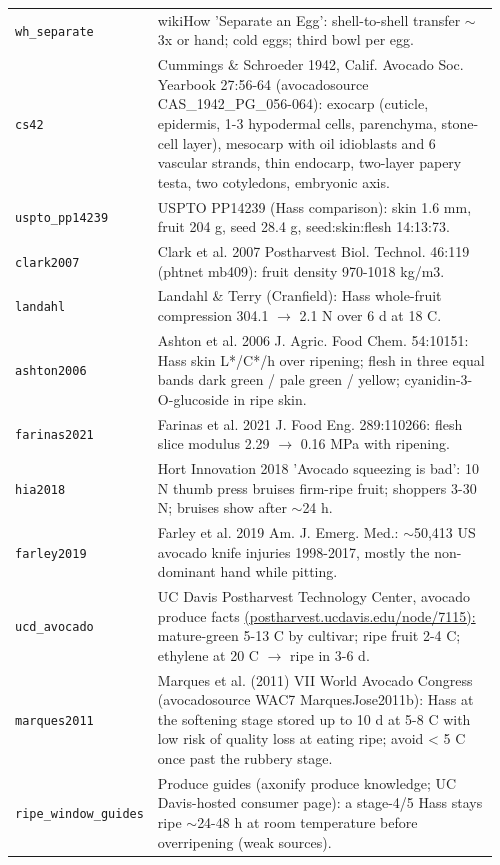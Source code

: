 \documentclass[10.5pt,a4paper]{article}
\begin{document}
{\begin{longtable}{@{}p{0.16\linewidth}p{0.8\linewidth}@{}}
\texttt{wh\_\allowbreak{}separate} & wikiHow 'Separate an Egg': shell-to-shell transfer $\sim$3x or hand; cold eggs; third bowl per egg. \\
\texttt{cs42} & Cummings \& Schroeder 1942, Calif. Avocado Soc. Yearbook 27:56-64 (avocadosource CAS\_1942\_PG\_056-064): exocarp (cuticle, epidermis, 1-3 hypodermal cells, parenchyma, stone-cell layer), mesocarp with oil idioblasts and 6 vascular strands, thin endocarp, two-layer papery testa, two cotyledons, embryonic axis. \\
\texttt{uspto\_\allowbreak{}pp14239} & USPTO PP14239 (Hass comparison): skin 1.6 mm, fruit 204 g, seed 28.4 g, seed:skin:flesh 14:13:73. \\
\texttt{clark2007} & Clark et al. 2007 Postharvest Biol. Technol. 46:119 (phtnet mb409): fruit density 970-1018 kg/m3. \\
\texttt{landahl} & Landahl \& Terry (Cranfield): Hass whole-fruit compression 304.1 $\to$ 2.1 N over 6 d at 18 C. \\
\texttt{ashton2006} & Ashton et al. 2006 J. Agric. Food Chem. 54:10151: Hass skin L*/C*/h over ripening; flesh in three equal bands dark green / pale green / yellow; cyanidin-3-O-glucoside in ripe skin. \\
\texttt{farinas2021} & Farinas et al. 2021 J. Food Eng. 289:110266: flesh slice modulus 2.29 $\to$ 0.16 MPa with ripening. \\
\texttt{hia2018} & Hort Innovation 2018 'Avocado squeezing is bad': 10 N thumb press bruises firm-ripe fruit; shoppers 3-30 N; bruises show after $\sim$24 h. \\
\texttt{farley2019} & Farley et al. 2019 Am. J. Emerg. Med.: $\sim$50,413 US avocado knife injuries 1998-2017, mostly the non-dominant hand while pitting. \\
\texttt{ucd\_\allowbreak{}avocado} & UC Davis Postharvest Technology Center, avocado produce facts \url{(postharvest.ucdavis.edu/node/7115):} mature-green 5-13 C by cultivar; ripe fruit 2-4 C; ethylene at 20 C $\to$ ripe in 3-6 d. \\
\texttt{marques2011} & Marques et al. (2011) VII World Avocado Congress (avocadosource WAC7 MarquesJose2011b): Hass at the softening stage stored up to 10 d at 5-8 C with low risk of quality loss at eating ripe; avoid < 5 C once past the rubbery stage. \\
\texttt{ripe\_\allowbreak{}window\_\allowbreak{}guides} & Produce guides (axonify produce knowledge; UC Davis-hosted consumer page): a stage-4/5 Hass stays ripe $\sim$24-48 h at room temperature before overripening (weak sources). \\

\end{longtable}}
\end{document}
